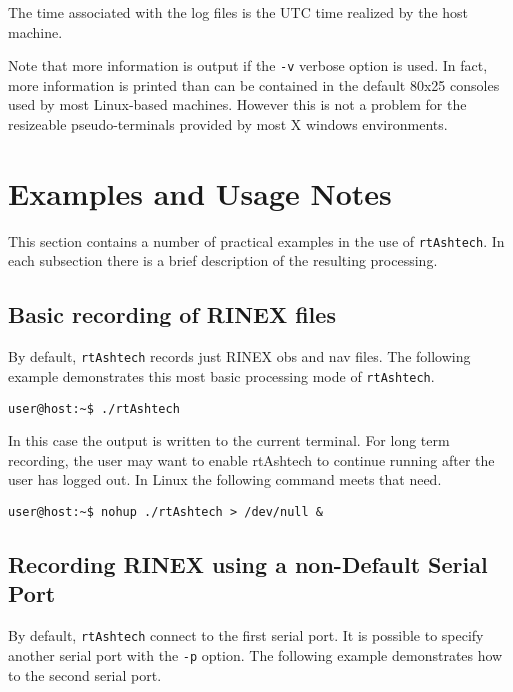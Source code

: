 The time associated with the log files is the UTC time realized by the host
machine.

Note that more information is output if the \texttt{-v} verbose option
is used. In fact, more information is printed than can be contained in 
the default 80x25 consoles used by most Linux-based machines. However this
is not a problem for the resizeable pseudo-terminals provided by most
X windows environments.

\section{Examples and Usage Notes}

This section contains a number of practical examples in the use of
\texttt{rtAshtech}. In each subsection there is a brief description of the
resulting processing.

\subsection{Basic recording of RINEX files}

By default, \texttt{rtAshtech} records just RINEX obs and nav files.
The following example demonstrates this
most basic processing mode of \texttt{rtAshtech}.

\small
\begin{singlespace}
\begin{verbatim}
user@host:~$ ./rtAshtech
\end{verbatim}
\end{singlespace}
\normalsize

In this case the output is written to the current terminal. For long
term recording, the user may want to enable rtAshtech to continue
running after the user has logged out. In Linux the following command
meets that need.

\small
\begin{singlespace}
\begin{verbatim}
user@host:~$ nohup ./rtAshtech > /dev/null &
\end{verbatim}
\end{singlespace}
\normalsize


\subsection{Recording RINEX using a non-Default Serial Port}

By default, \texttt{rtAshtech} connect to the first serial port. It is
possible to specify another serial port with the \texttt{-p} option. 
The following example demonstrates how to the second serial port.

